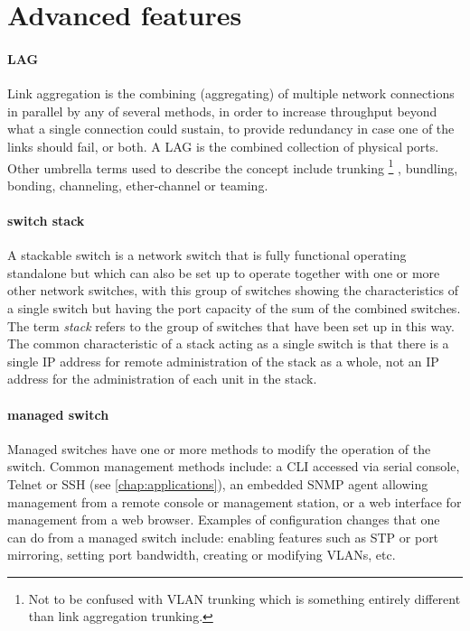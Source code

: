 \section{Advanced features}

\paragraph{\acf{LAG}}
Link aggregation is the combining (aggregating) of multiple network connections in parallel by any of several methods, in order to increase throughput beyond what a single connection could sustain, to provide redundancy in case one of the links should fail, or both.
A \ac{LAG} is the combined collection of physical ports.
Other umbrella terms used to describe the concept include trunking%
   \footnote{Not to be confused with \acs{VLAN} trunking which is something entirely different than link aggregation trunking.}%
, bundling, bonding, channeling, ether-channel or teaming.


\paragraph{switch stack}
A stackable switch is a network switch that is fully functional operating standalone but which can also be set up to operate together with one or more other network switches, with this group of switches showing the characteristics of a single switch but having the port capacity of the sum of the combined switches.
The term \emph{stack} refers to the group of switches that have been set up in this way.
The common characteristic of a stack acting as a single switch is that there is a single \acs{IP} address for remote administration of the stack as a whole, not an \acs{IP} address for the administration of each unit in the stack.

\paragraph{managed switch}
\label{par:ethernet-switch-managed}
Managed switches have one or more methods to modify the operation of the switch.
Common management methods include: a \ac{CLI} accessed via serial console, Telnet or \ac{SSH} (see \vref{chap:applications}), an embedded \ac{SNMP} agent allowing management from a remote console or management station, or a web interface for management from a web browser.
Examples of configuration changes that one can do from a managed switch include: enabling features such as \ac{STP} or port mirroring, setting port bandwidth, creating or modifying \acp{VLAN}, etc.

